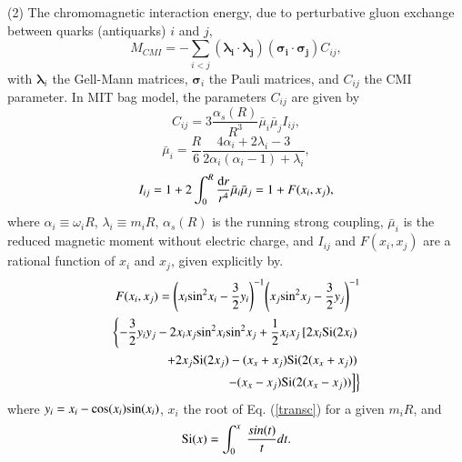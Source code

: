 \documentclass[prt,twocolumn,floatfix,nofootinbib]{revtex4}
\begin{document}
(2) The chromomagnetic interaction energy, due to perturbative gluon exchange between quarks (antiquarks) $i$ and $j$,
\begin{equation}\label{CMI}
    M_{CMI}=-\sum_{i<j} \left(\boldsymbol{\lambda_{i}}\cdot \boldsymbol{\lambda_{j}}\right) \left(\boldsymbol{\sigma_{i}}\cdot \boldsymbol{\sigma_{j}}\right)C_{ij},
\end{equation}
with $\boldsymbol{\lambda}_{i}$ the Gell-Mann matrices, $\boldsymbol{\sigma}_{i}$ the Pauli matrices, and $C_{ij}$ the CMI parameter. In MIT bag model, the parameters $C_{ij}$ are given by
\begin{equation}\label{Cij}
    C_{ij}=3\frac{\alpha_{s}\left(R\right)}{R^{3}}\bar{\mu}_{i}\bar{\mu}_{j}I_{ij},
\end{equation}
\begin{equation}\label{muBari}
   \bar{\mu}_{i}=\frac{R}{6} \frac{4\alpha_{i}+2\lambda_{i}-3}{2\alpha_{i}\left(\alpha_{i}-1\right)+\lambda_{i}},
\end{equation}
\begin{equation}\label{Iij}
    I_{ij}=1+2\int_{0}^{R} \frac{{\rm d}r}{r^{4}} \bar{\mu}_{i}\bar{\mu}_{j}=1+F(x_{i}, x_{j}),
\end{equation}
where $\alpha_{i}\equiv\omega_{i}R$, $\lambda_{i}\equiv m_{i}R$, $\alpha_{s}\left(R\right)$ is the running strong coupling, $\bar{\mu}_{i}$ is the reduced magnetic moment without electric charge,
and $I_{ij}$ and $F(x_{i}, x_{j})$ are a rational function of $x_{i}$ and $x_{j}$, given explicitly by\cite{DeGrand:1975cf}.
\begin{equation}\label{F}
    \begin{aligned}
        F(x_{i}, x_{j})={\left(x_{i} {\rm sin}^{2}x_{i}-\frac{3}{2}y_{i}\right)}^{-1} {\left(x_{j} {\rm sin^{2}}x_{j}-\frac{3}{2}y_{j}\right)}^{-1} \\
        \left\{-\frac{3}{2}y_{i}y_{j}-2x_{i}x_{j} {\rm sin}^{2}x_{i} {\rm sin}^{2}x_{j} +\frac{1}{2}x_{i}x_{j}\left[2x_{i} {\rm Si}(2x_{i}) \right.\right.\\
        \left.\left. +2x_{j} {\rm Si}(2x_{j}) -(x_{x}+x_{j}) {\rm Si}(2(x_{x}+x_{j})) \right.\right.\\
        \left.\left. -(x_{x}-x_{j}) {\rm Si}(2(x_{x}-x_{j})) \right] \right\}
    \end{aligned}
\end{equation}
where $y_{i}=x_{i}-{\rm cos}(x_{i}){\rm sin}(x_{i})$, $x_{i}$ the root of Eq. (\ref{transc}) for a given $m_{i}R$, and
\begin{equation}
    {\rm Si}(x)=\int_0^x\ \frac{sin(t)}{t}dt.
\end{equation}
\end{document}
